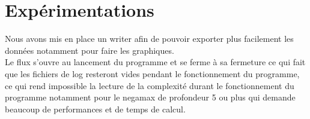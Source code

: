\documentclass[12pt]{article}
\begin{document}
\section{Expérimentations}

Nous avons mis en place un writer afin de pouvoir exporter plus facilement les données notamment pour faire les graphiques.\\

Le flux s'ouvre au lancement du programme et se ferme à sa fermeture ce qui fait que les fichiers de log resteront vides pendant le fonctionnement du programme, ce qui rend impossible la lecture de la complexité durant le fonctionnement du programme notamment pour le negamax de profondeur 5 ou plus qui demande beaucoup de performances et de temps de calcul.
\end{document}
